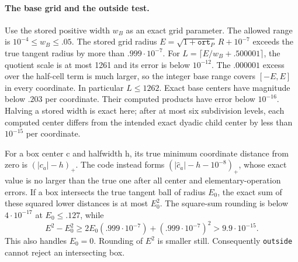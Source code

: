 \paragraph{The base grid and the outside test.}
Use the stored positive width $w_B$ as an exact grid parameter.
The allowed range is $10^{-4}\le w_B\le.05$.
The stored grid radius
$E=\sqrt{1+\mathtt{ort}_P}\,R+10^{-7}$ exceeds the true tangent
radius by more than $.999\cdot10^{-7}$.
For $L=\lceil E/w_B+.500001\rceil$, the quotient scale is at most
1261 and its error is below $10^{-12}$.
The $.000001$ excess over the half-cell term is much larger,
so the integer base range covers $[-E,E]$ in every coordinate.
In particular $L\le1262$.
Exact base centers have magnitude below $.203$ per coordinate.
Their computed products have error below $10^{-16}$.
Halving a stored width is exact here; after at most six subdivision
levels, each computed center differs from the intended exact dyadic
child center by less than $10^{-15}$ per coordinate.

For a box center c and halfwidth h, its true minimum coordinate
distance from zero is $(|c_a|-h)_+$.
The code instead forms
$(|\widehat c_a|-h-10^{-8})_+$, whose exact value is no larger than
the true one after all center and elementary-operation errors.
If a box intersects the true tangent ball of radius $E_0$,
the exact sum of these squared lower distances is at most $E_0^2$.
The square-sum rounding is below $4\cdot10^{-17}$ at
$E_0\le.127$, while
\[
 E^2-E_0^2
 \ge 2E_0(.999\cdot10^{-7})+(.999\cdot10^{-7})^2
 >9.9\cdot10^{-15}.
\]
This also handles $E_0=0$.
Rounding of $E^2$ is smaller still.  Consequently \texttt{outside}
cannot reject an intersecting box.

